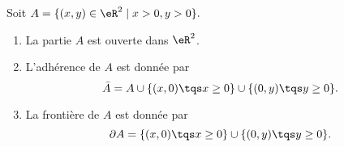 \begin{proposition}\label{exoEspVectoNorme0002}
	Soit $ A = \{( x, y) \in \eR^2 \; | \; x>0, y > 0 \}. $
	\begin{enumerate}
		\item
		      La partie $A$ est ouverte dans $\eR^2$.
		\item
		      L'adhérence de \( A\) est donnée par
		      \begin{equation}
			      \bar A=A\cup\{ (x,0)\tqs x\geq 0 \}\cup\{ (0,y)\tqs y\geq 0\}.
		      \end{equation}
		\item
		      La frontière de \( A\) est donnée par
		      \begin{equation}
			      \partial A=\{ (x,0)\tqs x\geq 0 \}\cup\{ (0,y)\tqs y\geq 0\}.
		      \end{equation}
	\end{enumerate}
\end{proposition}


